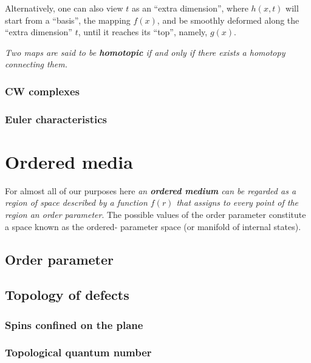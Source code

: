 \documentclass{book}
\begin{document}
Alternatively, one can also view $t$ as an ``extra dimension'', where $h(x,t)$ will start from a ``basis'', the mapping $f(x)$, and be smoothly deformed along
the ``extra dimension'' $t$, until it reaches its ``top'', namely, $g(x)$.
\begin{figure}[!h]
  \centering
\end{figure}

\textit{Two maps are said to be \textbf{homotopic} if and only if there exists a homotopy connecting them.}%
\subsection{CW complexes}
\subsection{Euler characteristics}
% 
\chapter{Ordered media}
For almost all of our purposes here \textit{an \textbf{ordered
medium} can be regarded as a region of space described
by a function $f(r)$ that assigns to every point of the
region an order parameter}. The possible values of the
order parameter constitute a space known as the ordered-
parameter space (or manifold of internal states).
\section{Order parameter}
\section{Topology of defects}
\subsection{Spins confined on the plane}
\subsection{Topological quantum number}
\end{document}
